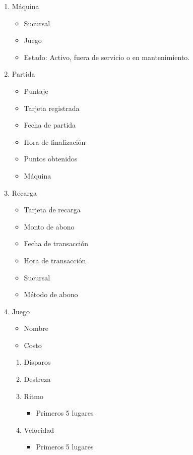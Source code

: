 \begin{enumerate}
    \item Máquina
    \begin{itemize}
        \item Sucursal
        \item Juego
        \item Estado: Activo, fuera de servicio o en mantenimiento.
    \end{itemize}

    \item Partida
    \begin{itemize}
        \item Puntaje
        \item Tarjeta registrada
        \item Fecha de partida
        \item Hora de finalización
        \item Puntos obtenidos
        \item Máquina
    \end{itemize}

    \item Recarga
    \begin{itemize}
        \item Tarjeta de recarga
        \item Monto de abono
        \item Fecha de transacción
        \item Hora de transacción
        \item Sucursal
        \item Método de abono
    \end{itemize}

    \item Juego
    \begin{itemize}
        \item Nombre
        \item Costo
    \end{itemize}
    \begin{enumerate}
        \item Disparos
        \item Destreza
        \item Ritmo
        \begin{itemize}
            \item Primeros 5 lugares
        \end{itemize}
        \item Velocidad
        \begin{itemize}
            \item Primeros 5 lugares
        \end{itemize}
    \end{enumerate}


\end{enumerate}
